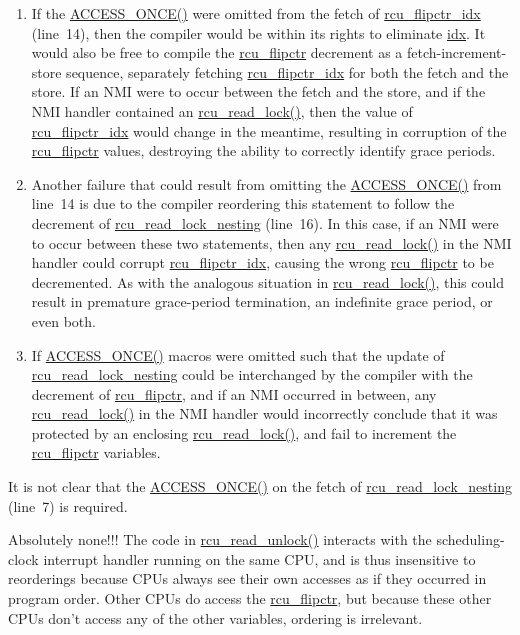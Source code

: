 
\begin{enumerate}
\item	If the \url{ACCESS_ONCE()} were omitted from the
	fetch of \url{rcu_flipctr_idx} (line~14), then the compiler
	would be within its rights to eliminate \url{idx}.
	It would also be free to compile the \url{rcu_flipctr}
	decrement as a fetch-increment-store sequence, separately fetching
	\url{rcu_flipctr_idx} for both the fetch and the store.
	If an NMI were to occur between the fetch and the store, and
	if the NMI handler contained an \url{rcu_read_lock()},
	then the value of \url{rcu_flipctr_idx} would change
	in the meantime, resulting in corruption of the
	\url{rcu_flipctr} values, destroying the ability
	to correctly identify grace periods.
\item	Another failure that could result from omitting the
	\url{ACCESS_ONCE()} from line~14 is due to
	the compiler reordering this statement to follow the
	decrement of \url{rcu_read_lock_nesting}
	(line~16).
	In this case, if an NMI were to occur between these two
	statements, then any \url{rcu_read_lock()} in the
	NMI handler could corrupt \url{rcu_flipctr_idx},
	causing the wrong \url{rcu_flipctr} to be
	decremented.
	As with the analogous situation in \url{rcu_read_lock()},
	this could result in premature grace-period termination,
	an indefinite grace period, or even both.
\item	If \url{ACCESS_ONCE()} macros were omitted such that
	the update of \url{rcu_read_lock_nesting} could be
	interchanged by the compiler with the decrement of
	\url{rcu_flipctr}, and if an NMI occurred in between,
	any \url{rcu_read_lock()} in the NMI handler would
	incorrectly conclude that it was protected by an enclosing
	\url{rcu_read_lock()}, and fail to increment the
	\url{rcu_flipctr} variables.
\end{enumerate}

It is not clear that the \url{ACCESS_ONCE()} on the
fetch of \url{rcu_read_lock_nesting} (line~7) is required.


	Absolutely none!!!  The code in \url{rcu_read_unlock()}
	interacts with the scheduling-clock interrupt handler
	running on the same CPU, and is thus insensitive to reorderings
	because CPUs always see their own accesses as if they occurred
	in program order.
	Other CPUs do access the \url{rcu_flipctr}, but because these
	other CPUs don't access any of the other variables, ordering is
	irrelevant.

